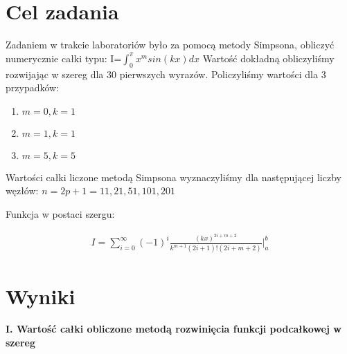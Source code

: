 \documentclass{article}
\begin{document}
\section{Cel zadania}

Zadaniem w trakcie laboratoriów było za pomocą metody Simpsona, obliczyć numerycznie całki typu: I=$\int_{0}^{\pi}x^msin(kx)dx $
Wartość dokładną obliczyliśmy rozwijając w szereg dla 30 pierwszych wyrazów. Policzyliśmy wartości dla 3 przypadków:
\begin{enumerate}
\item $m=0, k=1$
\item $m=1, k=1$
\item $m=5, k=5$
\end{enumerate}
Wartości całki liczone metodą Simpsona wyznaczyliśmy dla następującej liczby węzłów: $n=2p+1=11,21,51,101,201$

\newline
\setlength{\parindent}{0pt}
Funkcja w postaci szergu:

\begin{equation}
\begin{array}{c}
I=\displaystyle \sum^{\infty}_{i=0}(-1)^i \frac{(k x)^{2i+m+2}}{k^{m+1}(2i+1)!(2i+m+2)} \Big|^b_a
\end{array}
\end{equation}

\newpage
\section{Wyniki}
\textbf{I.  Wartość całki obliczone metodą rozwinięcia funkcji podcałkowej w szereg}
\end{document}
